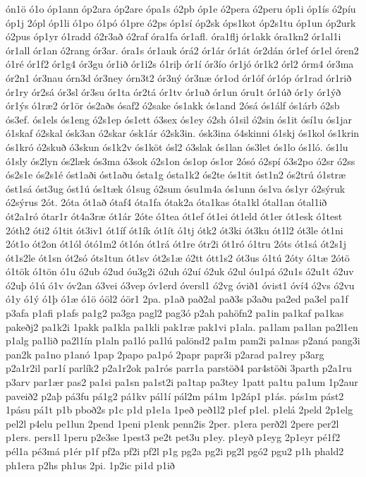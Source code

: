 {ón1ö
ó1o
óp1ann
óp2ara
óp2are
ópa1s
ó2pb
óp1e
ó2pera
ó2peru
óp1i
óp1ís
ó2píu
óp1j
2ópl
óp1li
ó1po
ó1pó
ó1pre
ó2ps
óp1sí
óp2sk
óps1kot
óp2s1tu
óp1un
óp2urk
ó2pus
óp1yr
ó1radd
ó2r3að
ó2raf
óra1fa
ór1afl.
óra1flj
ór1akk
óra1kn2
ór1al1i
ór1all
ór1an
ó2rang
ór3ar.
óra1s
ór1auk
órá2
ór1ár
ór1át
ór2dán
ór1ef
ór1el
óren2
ó1ré
ór1f2
ór1g4
ór3gu
ór1ið
ór1i2s
ó1riþ
ór1í
ór3ío
ór1jó
ór1k2
órl2
órm4
ór3ma
ór2n1
ór3nau
órn3d
ór3ney
órn3t2
ór3ný
ór3næ
ór1od
ór1óf
ór1óp
ór1rad
ór1rið
ór1ry
ór2sá
ór3sl
ór3su
ór1ta
ór2tá
ór1tv
ór1uð
ór1un
óru1t
ór1úð
ór1y
ór1ýð
ór1ýs
ó1ræ2
ór1ör
ós2aðs
ósaf2
ó2sake
ós1akk
ós1and
2ósá
ós1álf
ós1árb
ó2sb
ós3ef.
ós1els
ós1eng
ó2s1ep
ós1ett
ó3sex
ós1ey
ó2sh
ó1sil
ó2sin
ós1it
ósí1u
ós1jar
ó1skaf
ó2skal
ósk3an
ó2skar
ósk1ár
ó2sk3in.
ósk3ina
ó4skinni
ó1skj
ós1kol
ós1krin
ós1kró
ó2skuð
ó3skun
ós1k2v
ós1köt
ósl2
ó3slak
ós1lan
ós3let
ós1lo
ós1ló.
ós1lu
ó1sly
ós2lyn
ós2læk
ós3ma
ó3sok
ó2s1on
ós1op
ós1or
2ósó
ó2spí
ó3s2po
ó2sr
ó2ss
ós2s1e
ós2s1é
óst1aði
óst1aðu
ósta1g
ósta1k2
ós2te
ós1tit
óst1n2
ós2trú
ó1stræ
óst1sá
óst3ug
óst1ú
ós1tæk
ó1sug
ó2sum
ósu1m4a
ós1unn
ós1va
ós1yr
ó2sýruk
ó2sýrus
2ót.
2óta
ót1að
ótaf4
óta1fa
ótak2a
óta1kas
óta1kl
ótal1an
ótal1ið
ót2a1ró
ótar1r
ót4a3ræ
ót1ár
2óte
ó1tea
ót1ef
ót1ei
ót1eld
ót1er
ót1esk
ó1test
2óth2
óti2
ó1tit
ót3iv1
ót1íf
ót1ík
ót1ít
ó1tj
ótk2
ót3ki
ót3ku
ót1l2
ót3le
ót1ni
2ót1o
ót2on
ót1ól
ótó1m2
ót1ón
ót1rá
ót1re
ótr2i
ót1ró
ó1tru
2óts
ót1sá
ót2s1j
ót1s2le
ót1sn
ót2só
óts1tun
ót1sv
ót2s1æ
ó2tt
ótt1s2
ót3us
ó1tú
2óty
ó1tæ
2ótö
ó1tök
ó1tön
ó1u
ó2ub
ó2ud
óu3g2i
ó2uh
ó2uí
ó2uk
ó2ul
óu1pá
ó2u1s
ó2u1t
ó2uv
ó2uþ
ó1ú
ó1v
óv2an
ó3vei
ó3vep
óv1erd
óversl1
ó2vg
óvið1
óvist1
óví4
ó2vs
ó2vu
ó1y
ó1ý
ó1þ
ó1æ
ó1ö
óöl2
óör1
2pa.
p1að
pað2al
pað3s
p3aðu
pa2ed
pa3el
pa1f
p3afa
p1afi
p1afs
pa1g2
pa3ga
pagl2
pag3ó
p2ah
pahöfn2
pa1in
pa1kaf
pa1kas
pakeðj2
pa1k2i
1pakk
pa1kla
pa1kli
pak1ræ
pak1vi
p1ala.
pa1lam
pa1lan
pa2l1en
p1alg
pa1lið
pa2l1ín
p1aln
pa1ló
pa1lú
palönd2
pa1m
pam2i
pa1nas
p2aná
pang3i
pan2k
pa1no
p1anó
1pap
2papo
pa1pó
2papr
papr3i
p2arad
pa1rey
p3arg
p2a1r2il
par1í
parlík2
p2a1r2ok
pa1rós
parr1a
parstöð4
par4stöði
3parth
p2a1ru
p3arv
par1ær
pas2
pa1si
pa1sn
pa1st2i
pa1tap
pa3tey
1patt
pa1tu
pa1um
1p2aur
paveið2
p2aþ
pá3fu
pá1g2
pá1kv
pál1í
pál2m
pá1m
1p2áp1
p1ás.
pás1m
pást2
1pásu
pá1t
p1b
pboð2s
p1c
p1d
p1e1a
1peð
peð1l2
p1ef
p1el.
p1elá
2peld
2p1elg
pel2l
p4elu
pe1lun
2pend
1peni
p1enk
penn2is
2per.
p1era
perð2l
2pere
per2l
p1ers.
pers1l
1peru
p2e3se
1pest3
pe2t
pet3u
p1ey.
p1eyð
p1eyg
2p1eyr
pé1f2
pél1a
pé3má
p1ér
p1f
pf2a
pf2i
pf2l
p1g
pg2a
pg2i
pg2l
pgó2
pgu2
p1h
phald2
ph1era
p2hs
ph1us
2pi.
1p2ic
pi1d
p1ið
}
